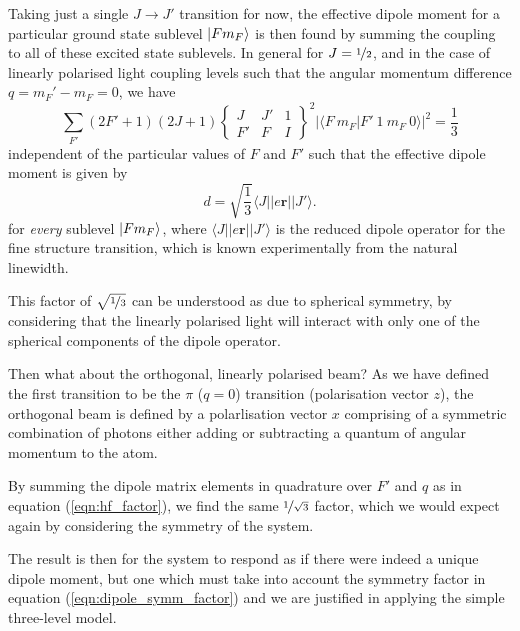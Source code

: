     Taking just a single $J \rightarrow J'$ transition for now, the effective
    dipole moment for a particular ground state sublevel $\Ket{F m_F}$ is then
    found by summing the coupling to all of these excited state sublevels. In
    general for $J = \nicefrac{1}{2}$\cite{test1}, and in the case of 
    linearly polarised light coupling levels such that the angular momentum
    difference $q
    = m_F' - m_F = 0$, we have\cite{Steck2001}
    \begin{equation}\label{eqn:hf_factor}
      \sum_{F'} (2 F' + 1)(2 J + 1) 
        \begin{Bmatrix}
          J & J' & 1 \\[8pt]
          F' & F & I
        \end{Bmatrix}^2
        \lvert \langle F~m_F \vert F'~1~m_F~0 \rangle \rvert^2 = \frac{1}{3}
    \end{equation}
    independent of the particular values of $F$ and $F'$ such that the effective dipole moment is given by
    \begin{equation}\label{eqn:dipole_symm_factor}
      d = 
        \sqrt{\frac{1}{3}} \langle J || e \mathbf{r} || J' \rangle.
    \end{equation}
    for \textit{every} sublevel $\Ket{F m_F}$, where $\langle J || e \mathbf{r}
    || J' \rangle$ is the reduced dipole operator for the fine structure
    transition, which is known experimentally from the natural linewidth.

    This factor of $\sqrt{\nicefrac{1}{3}}$ can be understood as due to
    spherical symmetry, by considering that the linearly polarised light will
    interact with only one of the spherical components of the dipole
    operator.\cite{Steck2001}

    Then what about the orthogonal, linearly polarised beam? As we have defined
    the first transition to be the $\pi$ ($q = 0$) transition (polarisation
    vector $z$), the orthogonal beam is defined by a polarlisation vector $x$
    comprising of a symmetric combination of photons either adding or
    subtracting a quantum of angular momentum to the atom. 

    By summing the dipole matrix elements in quadrature over $F'$ and $q$ as in
    equation (\ref{eqn:hf_factor}), we find the same $\nicefrac{1}{\sqrt{3}}$
    factor, which we would expect again by considering the symmetry of the
    system.

    The result is then for the system to respond as if there were indeed a
    unique dipole moment, but one which must take into account the symmetry
    factor in equation (\ref{eqn:dipole_symm_factor}) and we are justified in
    applying the simple three-level model.

